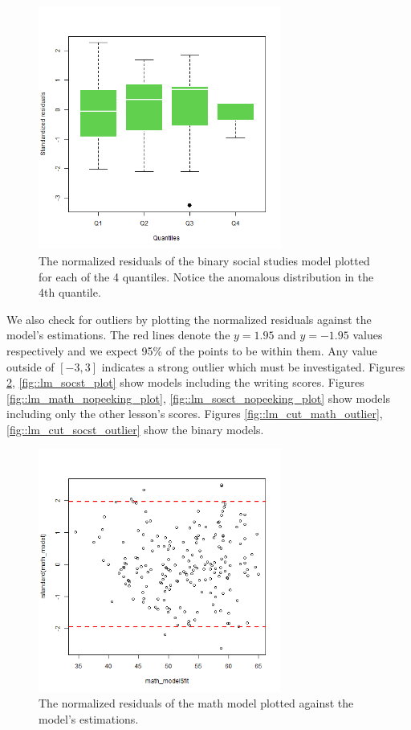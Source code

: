 \documentclass[10pt, a4paper]{article}
\begin{document}
	\begin{figure}
		\includegraphics[width=8cm]{lm_socst_binary_residual_boxplot.png}
		\centering
		\caption{The normalized residuals of the binary social studies model plotted for each of the 4 quantiles. Notice the anomalous distribution in the 4th quantile.}
		\label{fig::lm_cut_socst_boxplot}
	\end{figure}


	We also check for outliers by plotting the normalized residuals against the model's estimations. The red lines denote the $y=1.95$ and $y=-1.95$ values respectively and we expect 95\% of the points to be within them. Any value outside of $[-3,3]$ indicates a strong outlier which must be investigated. Figures \ref{fig::lm_math_plot}, \ref{fig::lm_socst_plot} show models including the writing scores. Figures \ref{fig::lm_math_nopeeking_plot}, \ref{fig::lm_sosct_nopeeking_plot} show models including only the other lesson's scores. Figures \ref{fig::lm_cut_math_outlier}, \ref{fig::lm_cut_socst_outlier} show the binary models.
	
	 \begin{figure}
	 	\includegraphics[width=8cm]{lm_math_residual_plot.png}
	 	\centering
	 	\caption{The normalized residuals of the math model plotted against the model's estimations.}
	 	\label{fig::lm_math_plot}
	 \end{figure}
 
\end{document}

